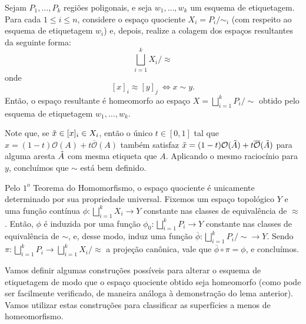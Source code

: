 \begin{lemma}
    Sejam $P_1,\ldots, P_k$ regiões poligonais, e seja $w_1,\ldots, w_k$ um esquema de etiquetagem. Para cada $1\leq i\leq n$, considere o espaço quociente $X_i = P_i/\sim_i$ (com respeito ao esquema de etiquetagem $w_i$) e, depois, realize a colagem dos espaços resultantes da seguinte forma:
    \[\bigsqcup_{i=1}^k X_i/\approx\]
    onde
    \[[x]_i \approx [y]_j ~\Longleftrightarrow x \sim y.\]
    Então, o espaço resultante é homeomorfo ao espaço $X = \bigsqcup_{i=1}^k P_i/\sim$ obtido pelo esquema de etiquetagem $w_1,\ldots, w_k$.
    \begin{dem}
        Note que, se $\Tilde{x} \in [x]_i \in X_i$, então o único $t \in [0,1]$ tal que $x = (1-t) \mathcal{O}(A) + t \overline{\mathcal{O}}(A)$ também satisfaz $\Tilde{x} = (1-t) \mathcal{O}(\Tilde{A}) + t \overline{\mathcal{O}}(\Tilde{A})$ para alguma aresta $\Tilde{A}$ com mesma etiqueta que $A$. Aplicando o mesmo raciocínio para $y$, concluímos que $\sim$ está bem definido.
        
        Pelo $1^o$ Teorema do Homomorfismo, o espaço quociente é unicamente determinado por sua propriedade universal. Fixemos um espaço topológico $Y$ e uma função contínua $\phi: \bigsqcup_{i=1}^k X_i \to Y$ constante nas classes de equivalência de $\approx$. Então, $\phi$ é induzida por uma função $\phi_0: \bigsqcup_{i=1}^k P_i \to Y$ constante nas classes de equivalência de $\sim$, e, desse modo, induz uma função $\overline{\phi}: \bigsqcup_{i=1}^k P_i/\sim \to Y$. Sendo $\pi: \bigsqcup_{i=1}^k P_i \to \bigsqcup_{i=1}^k X_i/\approx$ a projeção canônica, vale que $\overline{\phi}\circ \pi = \phi$, e concluímos.
    \end{dem}
\end{lemma}

Vamos definir algumas construções possíveis para alterar o esquema de etiquetagem de modo que o espaço quociente obtido seja homeomorfo (como pode ser facilmente verificado, de maneira análoga à demonstração do lema anterior). Vamos utilizar estas construções para classificar as superfícies a menos de homeomorfismo.

